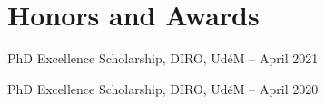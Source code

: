 \documentclass[a4paper,20pt]{article}
\begin{document}
	\vspace{-5pt}
	\section{Honors and Awards}
	\begin{description}[font=$\bullet$]
		\item {PhD Excellence Scholarship, DIRO, Ud\'eM -- April 2021}
		\vspace{-5pt}
		\item {PhD Excellence Scholarship, DIRO, Ud\'eM -- April 2020}
		
	\end{description}

	
\end{document}
